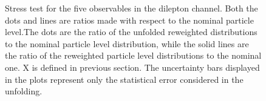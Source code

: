 \begin{figure}[ht]
  \centering
  \quad\quad
  \quad\quad
  \quad\quad
  \quad\quad
  \quad\quad
  \caption{Stress test for the five observables in the dilepton channel. Both the dots and lines are ratios made with respect to the nominal particle level.The dots are the ratio of the unfolded reweighted distributions to the nominal particle level distribution, while the solid lines are the ratio of the reweighted particle level distributions to the nominal one. X is defined in previous section. The uncertainty bars displayed in the plots represent only 
  the statistical error considered in the unfolding.}


\end{figure}
